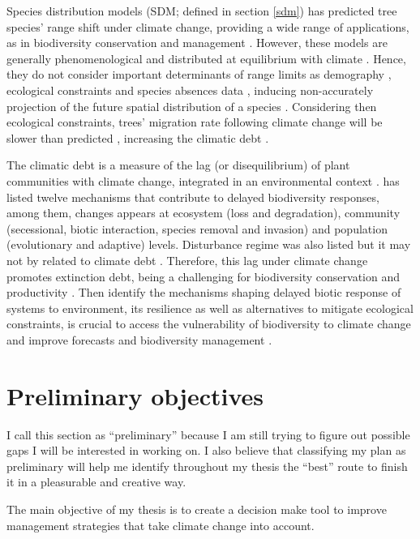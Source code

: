 Species distribution models (SDM; defined in section \ref{sdm}) has predicted tree species' range shift under climate change, providing a wide range of applications, as in biodiversity conservation and management \citep{Guisan2005,Guisan2013}.
However, these models are generally phenomenological and  distributed at equilibrium with climate \citep[e.g.][]{Pigot2013}.
Hence, they do not consider important determinants of range limits as demography \citep{Louthan2015}, ecological constraints \citep{Wisz2013,Pigot2013} and species absences data \citep{Koshkina2017}, inducing non-accurately projection of the future spatial distribution of a species \citep{Tavecchia2016}.
Considering then ecological constraints, trees' migration rate following climate change will be slower than predicted \citep{Bertrand2011,Sittaro2017}, increasing the climatic debt \citep{Bertrand2016}.

The climatic debt is a measure of the lag (or disequilibrium) of plant communities with climate change, integrated in an environmental context \citep{Bertrand2016}.
\citet{Essl2015} has listed twelve mechanisms that contribute to delayed biodiversity responses, among them, changes appears at ecosystem (loss and degradation), community (secessional, biotic interaction, species removal and invasion) and population (evolutionary and adaptive) levels.
Disturbance regime was also listed but it may not by related to climate debt \citep{Bertrand2016}.
Therefore, this lag under climate change promotes extinction debt, being a challenging for biodiversity conservation \citep{Kuussaari2009} and productivity \citep{Lasch2002}.
Then identify the mechanisms shaping delayed biotic response of systems to environment, its resilience as well as alternatives to mitigate ecological constraints, is crucial to access the vulnerability of biodiversity to climate change and improve forecasts and biodiversity management \citep{Essl2015,Oliver2015,Bertrand2016}.

\section{Preliminary objectives}
I call this section as ``preliminary'' because I am still trying to figure out possible gaps I will be interested in working on.
I also believe that classifying my plan as preliminary will help me identify throughout my thesis the ``best'' route to finish it in a pleasurable and creative way.

The main objective of my thesis is to create a decision make tool to improve management strategies that take climate change into account.

